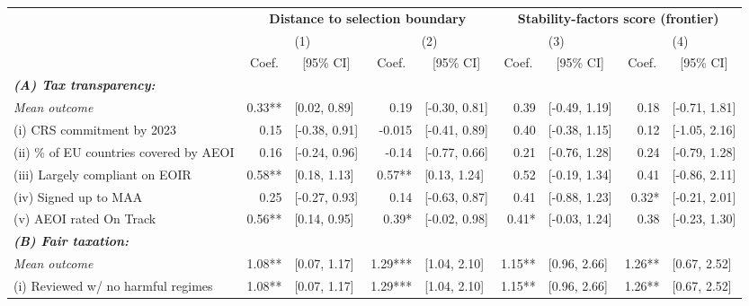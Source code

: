 \begin{adjustbox}{max width=\textwidth}
\begin{tabular}{l*{4}{r@{\hspace{3pt}}l}}
\toprule
&\multicolumn{4}{c}{{\bf Distance to selection boundary}}&\multicolumn{4}{c}{{\bf Stability-factors score (frontier)}}\\
\cmidrule(lr){2-5}
\cmidrule(lr){6-9}
&\multicolumn{2}{c}{(1)}&\multicolumn{2}{c}{(2)}&\multicolumn{2}{c}{(3)}&\multicolumn{2}{c}{(4)}\\
&\multicolumn{1}{c}{Coef.}&\multicolumn{1}{c}{[95\% CI]}&\multicolumn{1}{c}{Coef.}&\multicolumn{1}{c}{[95\% CI]}&\multicolumn{1}{c}{Coef.}&\multicolumn{1}{c}{[95\% CI]}&\multicolumn{1}{c}{Coef.}&\multicolumn{1}{c}{[95\% CI]}\\
\midrule
\emph{{\bf (A) Tax transparency: }}&&&&&&&&\\
\hspace{.3cm} \emph{Mean outcome}& 0.33** & [0.02, 0.89] & 0.19 & [-0.30, 0.81] & 0.39 & [-0.49, 1.19] & 0.18 & [-0.71, 1.81] \\
\hspace{.4cm} (i) CRS commitment by 2023& 0.15 & [-0.38, 0.91] & -0.015 & [-0.41, 0.89] & 0.40 & [-0.38, 1.15] & 0.12 & [-1.05, 2.16] \\
\hspace{.4cm} (ii) \% of EU countries covered by AEOI& 0.16 & [-0.24, 0.96] & -0.14 & [-0.77, 0.66] & 0.21 & [-0.76, 1.28] & 0.24 & [-0.79, 1.28] \\
\hspace{.4cm} (iii) Largely compliant on EOIR& 0.58** & [0.18, 1.13] & 0.57** & [0.13, 1.24] & 0.52 & [-0.19, 1.34] & 0.41 & [-0.86, 2.11] \\
\hspace{.4cm} (iv) Signed up to MAA& 0.25 & [-0.27, 0.93] & 0.14 & [-0.63, 0.87] & 0.41 & [-0.88, 1.23] & 0.32* & [-0.21, 2.01] \\
\hspace{.4cm} (v) AEOI rated On Track& 0.56** & [0.14, 0.95] & 0.39* & [-0.02, 0.98] & 0.41* & [-0.03, 1.24] & 0.38 & [-0.23, 1.30] \\
\midrule \emph{{\bf (B) Fair taxation: }}&&&&&&&&\\
\hspace{.3cm} \emph{Mean outcome}& 1.08** & [0.07, 1.17] & 1.29*** & [1.04, 2.10] & 1.15** & [0.96, 2.66] & 1.26** & [0.67, 2.52] \\
\hspace{.3cm} (i) Reviewed w/ no harmful regimes& 1.08** & [0.07, 1.17] & 1.29*** & [1.04, 2.10] & 1.15** & [0.96, 2.66] & 1.26** & [0.67, 2.52] \\

\end{tabular}
\end{adjustbox}
